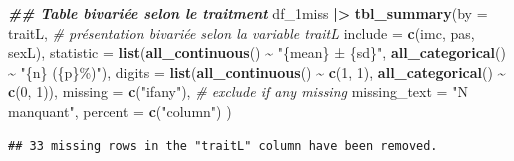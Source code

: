 \documentclass[
]{book}
\newenvironment{Shaded}{\begin{snugshade}}{\end{snugshade}}
\newcommand{\AttributeTok}[1]{\textcolor[rgb]{0.13,0.29,0.53}{#1}}
\newcommand{\CommentTok}[1]{\textcolor[rgb]{0.56,0.35,0.01}{\textit{#1}}}
\newcommand{\DecValTok}[1]{\textcolor[rgb]{0.00,0.00,0.81}{#1}}
\newcommand{\DocumentationTok}[1]{\textcolor[rgb]{0.56,0.35,0.01}{\textbf{\textit{#1}}}}
\newcommand{\FunctionTok}[1]{\textcolor[rgb]{0.13,0.29,0.53}{\textbf{#1}}}
\newcommand{\NormalTok}[1]{#1}
\newcommand{\SpecialCharTok}[1]{\textcolor[rgb]{0.81,0.36,0.00}{\textbf{#1}}}
\newcommand{\StringTok}[1]{\textcolor[rgb]{0.31,0.60,0.02}{#1}}
\begin{document}
\begin{Shaded}
\begin{Highlighting}[]
\DocumentationTok{\#\# Table bivariée selon le traitment}
\NormalTok{df\_1miss }\SpecialCharTok{|\textgreater{}} 
  \FunctionTok{tbl\_summary}\NormalTok{(}\AttributeTok{by =}\NormalTok{ traitL, }\CommentTok{\# présentation bivariée selon la variable traitL}
              \AttributeTok{include =} \FunctionTok{c}\NormalTok{(imc, pas, sexL), }
              \AttributeTok{statistic =} \FunctionTok{list}\NormalTok{(}\FunctionTok{all\_continuous}\NormalTok{() }\SpecialCharTok{\textasciitilde{}} \StringTok{"\{mean\} ± \{sd\}"}\NormalTok{, }
                               \FunctionTok{all\_categorical}\NormalTok{() }\SpecialCharTok{\textasciitilde{}} \StringTok{"\{n\} (\{p\}\%)"}\NormalTok{),}
              \AttributeTok{digits =} \FunctionTok{list}\NormalTok{(}\FunctionTok{all\_continuous}\NormalTok{() }\SpecialCharTok{\textasciitilde{}} \FunctionTok{c}\NormalTok{(}\DecValTok{1}\NormalTok{, }\DecValTok{1}\NormalTok{), }
                            \FunctionTok{all\_categorical}\NormalTok{() }\SpecialCharTok{\textasciitilde{}} \FunctionTok{c}\NormalTok{(}\DecValTok{0}\NormalTok{, }\DecValTok{1}\NormalTok{)),}
              \AttributeTok{missing =} \FunctionTok{c}\NormalTok{(}\StringTok{"ifany"}\NormalTok{), }\CommentTok{\# exclude if any missing}
              \AttributeTok{missing\_text =} \StringTok{"N manquant"}\NormalTok{, }
              \AttributeTok{percent =} \FunctionTok{c}\NormalTok{(}\StringTok{"column"}\NormalTok{)}
\NormalTok{  )}
\end{Highlighting}
\end{Shaded}

\begin{verbatim}
## 33 missing rows in the "traitL" column have been removed.
\end{verbatim}
\end{document}
